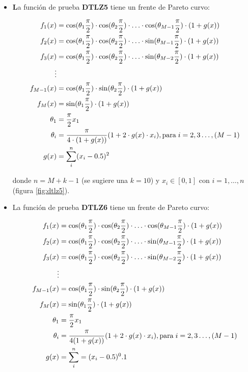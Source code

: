 \begin{itemize}
\item \textbf La funci\'on de prueba \textbf{DTLZ5} tiene un frente de Pareto curvo:

\begin{align*}
f_1(x)&=\cos(\theta_1\frac{\pi}{2})\cdot\cos(\theta_2\frac{\pi}{2})\cdot\ldots\cdot \cos(\theta_{M-1}\frac{\pi}{2})\cdot(1+g(x))\\
f_2(x)&=\cos(\theta_1\frac{\pi}{2})\cdot\cos(\theta_2\frac{\pi}{2})\cdot\ldots\cdot \sin(\theta_{M-1}\frac{\pi}{2})\cdot(1+g(x))\\
f_3(x)&=\cos(\theta_1\frac{\pi}{2})\cdot\cos(\theta_2\frac{\pi}{2})\cdot\ldots\cdot \sin(\theta_{M-2}\frac{\pi}{2})\cdot(1+g(x))\\
\vdots&\\
f_{M-1}(x)&=\cos(\theta_1\frac{\pi}{2})\cdot\sin(\theta_2\frac{\pi}{2})\cdot(1+g(x))\\
f_{M}(x)&=\sin(\theta_1\frac{\pi}{2})\cdot(1+g(x))\\
\theta_1&=\frac{\pi}{2}x_1\\
\theta_i&=\frac{\pi}{4\cdot(1+g(x))}(1+2\cdot g(x)\cdot x_i),  \text{para} \hspace{1mm} i=2,3\dots,(M-1)\\
g(x)&=\sum^n_i(x_i-0.5)^2
\end{align*}

donde $n=M+k-1$ (se sugiere una $k=10$) y $x_i\in[0,1]$ con $i = 1,\ldots,n$ (figura \ref{fig:dtlz5}).

\item La funci\'on de prueba \textbf{DTLZ6} tiene un frente de Pareto curvo:

\begin{align*}
f_1(x)&=\cos(\theta_1\frac{\pi}{2})\cdot\cos(\theta_2\frac{\pi}{2})\cdot\ldots\cdot \cos(\theta_{M-1}\frac{\pi}{2})\cdot(1+g(x))\\
f_2(x)&=\cos(\theta_1\frac{\pi}{2})\cdot\cos(\theta_2\frac{\pi}{2})\cdot\ldots\cdot \sin(\theta_{M-1}\frac{\pi}{2})\cdot(1+g(x))\\
f_3(x)&=\cos(\theta_1\frac{\pi}{2})\cdot\cos(\theta_2\frac{\pi}{2})\cdot\ldots\cdot \sin(\theta_{M-2}\frac{\pi}{2})\cdot(1+g(x))\\
\vdots&\\
f_{M-1}(x)&=\cos(\theta_1\frac{\pi}{2})\cdot\sin(\theta_2\frac{\pi}{2})\cdot(1+g(x))\\
f_{M}(x)&=\sin(\theta_1\frac{\pi}{2})\cdot(1+g(x))\\
\theta_1&=\frac{\pi}{2}x_1\\
\theta_i&=\frac{\pi}{4(1+g(x))}(1+2\cdot g(x)\cdot x_i),  \text{para}\hspace{1mm} i=2,3\dots,(M-1)\\
g(x)&=\sum^n_i=(x_i-0.5)^0.1
\end{align*}


\end{itemize}
